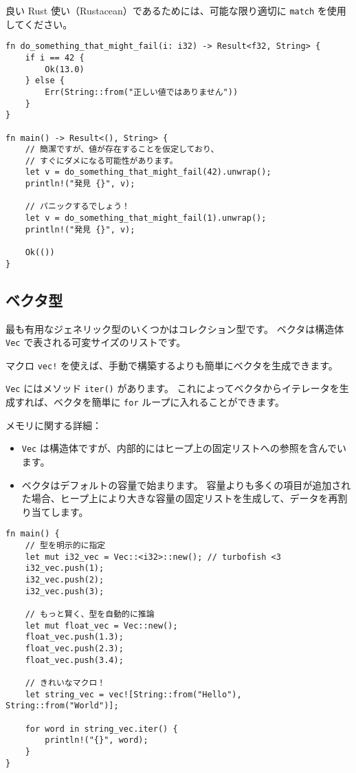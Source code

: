 良い Rust 使い（Rustacean）であるためには、可能な限り適切に
\texttt{match} を使用してください。

\begin{verbatim}
fn do_something_that_might_fail(i: i32) -> Result<f32, String> {
    if i == 42 {
        Ok(13.0)
    } else {
        Err(String::from("正しい値ではありません"))
    }
}

fn main() -> Result<(), String> {
    // 簡潔ですが、値が存在することを仮定しており、
    // すぐにダメになる可能性があります。
    let v = do_something_that_might_fail(42).unwrap();
    println!("発見 {}", v);

    // パニックするでしょう！
    let v = do_something_that_might_fail(1).unwrap();
    println!("発見 {}", v);

    Ok(())
}
\end{verbatim}

\subsection{ベクタ型}

最も有用なジェネリック型のいくつかはコレクション型です。 ベクタは構造体
\texttt{Vec} で表される可変サイズのリストです。

マクロ \texttt{vec!}
を使えば、手動で構築するよりも簡単にベクタを生成できます。

\texttt{Vec} にはメソッド \texttt{iter()} があります。
これによってベクタからイテレータを生成すれば、ベクタを簡単に
\texttt{for} ループに入れることができます。

メモリに関する詳細：

\begin{itemize}
\item
  \texttt{Vec}
  は構造体ですが、内部的にはヒープ上の固定リストへの参照を含んでいます。
\item
  ベクタはデフォルトの容量で始まります。
  容量よりも多くの項目が追加された場合、ヒープ上により大きな容量の固定リストを生成して、データを再割り当てします。
\end{itemize}

\begin{verbatim}
fn main() {
    // 型を明示的に指定
    let mut i32_vec = Vec::<i32>::new(); // turbofish <3
    i32_vec.push(1);
    i32_vec.push(2);
    i32_vec.push(3);

    // もっと賢く、型を自動的に推論
    let mut float_vec = Vec::new();
    float_vec.push(1.3);
    float_vec.push(2.3);
    float_vec.push(3.4);

    // きれいなマクロ！
    let string_vec = vec![String::from("Hello"), String::from("World")];

    for word in string_vec.iter() {
        println!("{}", word);
    }
}
\end{verbatim}


